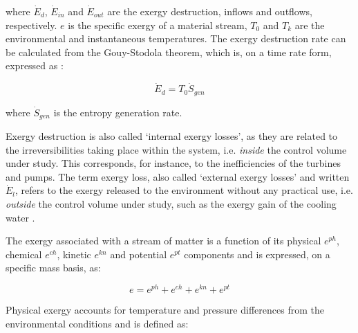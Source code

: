 \documentclass[final,times,3p]{elsarticle}
\begin{document}
	where $\dot{E}_d$, $\dot{E}_{in}$ and $\dot{E}_{out}$ are the exergy destruction, inflows and outflows, respectively. $e$ is the specific exergy of a material stream, $T_0$ and $T_k$ are the environmental and instantaneous temperatures. The exergy destruction rate can be calculated from the Gouy-Stodola theorem, which is, on a time rate form, expressed as \cite{Bejan2006}:

		
	\begin{equation}
		\dot{E}_d=T_0\dot{S}_{gen}
	\end{equation}
	
	where $\dot{S}_{gen}$ is the entropy generation rate.

	Exergy destruction is also called `internal exergy losses', as they are related to the irreversibilities taking place within the system, i.e. \emph{inside} the control volume under study. This corresponds, for instance, to the inefficiencies of the turbines and pumps. The term exergy loss, also called `external exergy losses' and written $\dot{E}_l$, refers to the exergy released to the environment without any practical use, i.e. \emph{outside} the control volume under study, such as the exergy gain of the cooling water \cite{Szargut1998,Kotas1995,BejanAdrian;TsatsaronisGeorge;Moran1996}. 
	
	The exergy associated with a stream of matter is a function of its physical $e^{ph}$, chemical $e^{ch}$, kinetic $e^{kn}$ and potential $e^{pt}$ components \cite{BejanAdrian;TsatsaronisGeorge;Moran1996} and is expressed, on a specific mass basis, as:

		
	\begin{equation}
		e=e^{ph}+e^{ch}+e^{kn}+e^{pt}
	\end{equation}

	Physical exergy accounts for temperature and pressure differences from the environmental conditions and is defined as:  
		
\end{document}
